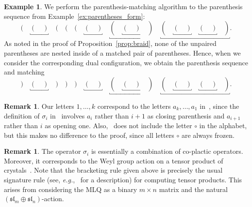 \documentclass[reqno]{amsart}
\newcommand{\0}{\phantom{c}}
\theoremstyle{plain}
\theoremstyle{definition}
\newtheorem{example}[thm]{Example}
\newtheorem{remark}[thm]{Remark}
\numberwithin{equation}{section}
\begin{document}
\begin{example}
We perform the parenthesis-matching algorithm to the parenthesis sequence from Example~\ref{ex:parentheses_form}:
\[
( \quad \underbracket{( \quad )} \quad ( \quad ( \quad ( \quad \underbracket{( \quad )} \quad \underbracket{( \quad \underbracket{( \quad )} \quad )} \quad \underbracket{( \quad \underbracket{( \quad )} \quad \underbracket{( \quad )} \quad )}.
\]
As noted in the proof of Proposition~\ref{prop:braid}, none of the unpaired parentheses are nested inside of a matched pair of parentheses.
Hence, when we consider the corresponding dual configuration, we obtain the parenthesis sequence and matching
\[
) \quad \underbracket{( \quad )} \quad ) \quad ) \quad ) \quad \underbracket{( \quad )} \quad \underbracket{( \quad \underbracket{( \quad )} \quad )} \quad \underbracket{( \quad \underbracket{( \quad )} \quad \underbracket{( \quad )} \quad )}.
\]
\end{example}

\begin{remark}
Our letters $1, \ldots, k$ correspond to the letters $a_k, \ldots, a_1$ in~\cite{Loth},
since the definition of $\sigma_i$ in~\cite{Loth} involves $a_i$ rather
than $i+1$ as closing parenthesis and $a_{i+1}$ rather than $i$ as opening one.
Also,~\cite{Loth} does not include the letter $\circ$ in the alphabet,
but this makes no difference to the proof, since all letters $\circ$ are always frozen.
\end{remark}

\begin{remark}
The operator $\sigma_i$ is essentially a combination of co-plactic operators.
Moreover, it corresponds to the Weyl group action on a tensor product of crystals~\cite{BS17}.
Note that the bracketing rule given above is precisely the usual signature rule (see, \textit{e.g.},~\cite[Sec.~2.4]{BS17} for a description) for computing tensor products.
This arises from considering the MLQ as a binary $m \times n$ matrix and the natural $(\mathfrak{sl}_m \oplus \mathfrak{sl}_n)$-action.
\end{remark}
\end{document}
